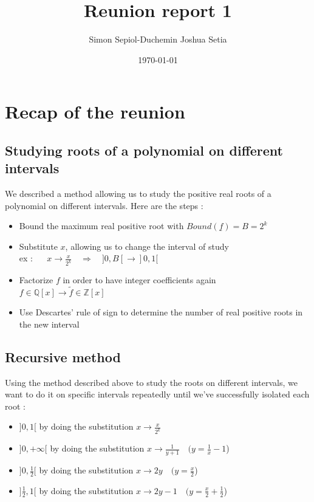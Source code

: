 \documentclass[a4paper,12pt]{article}
\title{Reunion report 1}
\author{Simon Sepiol-Duchemin Joshua Setia}
\date{\today}
\begin{document}
\maketitle

\section{Recap of the reunion}

\subsection*{Studying roots of a polynomial on different intervals}

We described a method allowing us to study the positive real roots of a
polynomial on different intervals. Here are the steps :
\begin{itemize}
  \item Bound the maximum real positive root with \( Bound(\underline{f}) = B = 2^k\)
  \item Substitute \(x\), allowing us to change the interval of study\\ex : $\quad$ \(x \rightarrow \frac{x}{2^k} \quad \Rightarrow \quad ]0,B[ \rightarrow ]0,1[\)
  \item Factorize \(f\) in order to have integer coefficients again \\\(f \in \mathbb{Q}[x] \rightarrow \tilde{f} \in \mathbb{Z}[x]\)
  \item Use Descartes’ rule of sign to determine the number of real positive roots in the new interval
\end{itemize}


\subsection*{Recursive method}
Using the method described above to study the roots on different intervals, we want to do it on specific intervals repeatedly until we've successfully isolated each root :
\begin{itemize}
  \item \(]0,1[\) by doing the substitution \(x \rightarrow \frac{x}{2^k}\)
  \item \(]0,+\infty[\) by doing the substitution \(x \rightarrow \frac{1}{y+1} \quad (y=\frac{1}{x}-1\))
  \item \(]0,\frac{1}{2}[\) by doing the substitution \(x \rightarrow 2y \quad (y=\frac{x}{2}\))
  \item \(]\frac{1}{2},1[\) by doing the substitution \(x \rightarrow 2y-1 \quad (y=\frac{x}{2}+\frac{1}{2}\))
\end{itemize}
\end{document}
